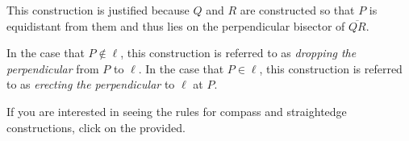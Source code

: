 \documentclass[12pt]{article}
\begin{document}
This construction is justified because $Q$ and $R$ are constructed so that $P$ is equidistant from them and thus lies on the perpendicular bisector of $\overline{QR}$.

In the case that $P \notin \ell$, this construction is referred to as \emph{dropping the perpendicular} from $P$ to $\ell$.  In the case that $P \in \ell$, this construction is referred to as \emph{erecting the perpendicular} to $\ell$ at $P$.

If you are interested in seeing the rules for compass and straightedge constructions, click on the  provided.
\end{document}
